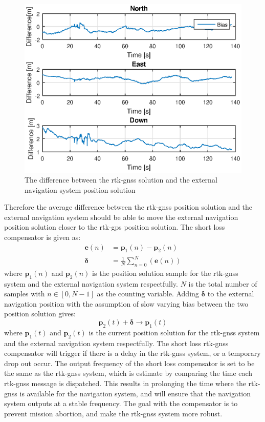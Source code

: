 \begin{figure}[H]
\centering
\includegraphics[scale=0.6]{figs/Experiment/biasShow.eps}
\caption{The difference between the \gls{rtk-gnss} solution and the external navigation system position solution}
\label{Fig:RtkExtDiff}
\end{figure}
Therefore the average difference between the \gls{rtk-gnss} position solution and the external navigation system should be able to move the external navigation position solution closer to the \gls{rtk-gps} position solution. The short loss compensator is given as:
\begin{align}
\mathbf{e}(n) &= \mathbf{p}_1(n) - \mathbf{p}_2(n)\\
\mathbf{\delta} &= \frac{1}{N}\sum_{n=0}^N(\mathbf{e}(n))
\end{align}
where $\mathbf{p}_1(n)$ and $\mathbf{p}_2(n)$ is the position solution sample for the \gls{rtk-gnss} system and the external navigation system respectfully. $N$ is the total number of samples with $n\in [0,N-1]$ as the counting variable. Adding $\mathbf{\delta}$ to the external navigation position with the assumption of slow varying bias between the two position solution gives:
\begin{equation}
\mathbf{p}_2(t) + \mathbf{\delta} \rightarrow \mathbf{p}_1(t)
\end{equation}
where $\mathbf{p}_1(t)$ and $\mathbf{p}_2(t)$ is the current position solution for the \gls{rtk-gnss} system and the external navigation system respectfully. The short loss \gls{rtk-gnss} compensator will trigger if there is a delay in the \gls{rtk-gnss} system, or a temporary drop out occur. The output frequency of the short loss compensator is set to be the same as the \gls{rtk-gnss} system, which is estimate by comparing the time each \gls{rtk-gnss} message is dispatched. This results in prolonging the time where the \gls{rtk-gnss} is available for the navigation system, and will ensure that the navigation system outputs at a stable frequency. The goal with the compensator is to prevent mission abortion, and make the \gls{rtk-gnss} system more robust.

